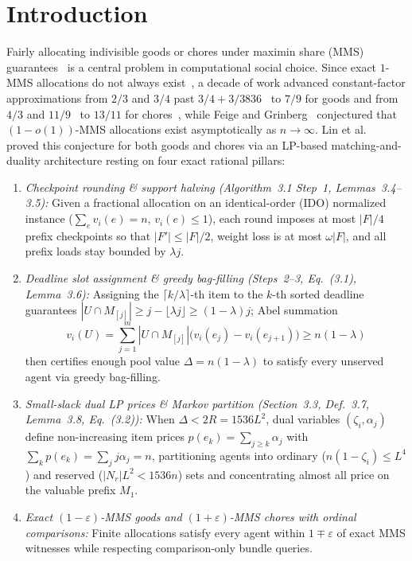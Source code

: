 \documentclass[11pt,twocolumn]{article}
\begin{document}
\section{Introduction}
Fairly allocating indivisible goods or chores under maximin share (MMS) guarantees~\cite{budish2011combinatorial} is a central problem in computational social choice. Since exact $1$-MMS allocations do not always exist~\cite{kurokawa2018fair}, a decade of work advanced constant-factor approximations from $2/3$ and $3/4$ past $3/4 + 3/3836$~\cite{akrami2024breaking} to $7/9$ for goods and from $4/3$ and $11/9$~\cite{huang2021algorithmic} to $13/11$ for chores~\cite{huang2023reduction}, while Feige and Grinberg~\cite{feige2025asymptotic} conjectured that $(1 - o(1))$-MMS allocations exist asymptotically as $n \to \infty$. Lin et al.~\cite{lin2026mms} proved this conjecture for both goods and chores via an LP-based matching-and-duality architecture resting on four exact rational pillars:
\begin{enumerate}[leftmargin=*,nosep]
  \item \emph{Checkpoint rounding \& support halving (Algorithm~3.1 Step~1, Lemmas~3.4--3.5):} Given a fractional allocation on an identical-order (IDO) normalized instance ($\sum_e v_i(e)=n$, $v_i(e)\le 1$), each round imposes at most $|F|/4$ prefix checkpoints so that $|F'| \le |F|/2$, weight loss is at most $\omega |F|$, and all prefix loads stay bounded by $\lambda j$.
  \item \emph{Deadline slot assignment \& greedy bag-filling (Steps~2--3, Eq.~(3.1), Lemma~3.6):} Assigning the $\lceil k/\lambda\rceil$-th item to the $k$-th sorted deadline guarantees $|U \cap M_{[j]}| \ge j - \lfloor \lambda j\rfloor \ge (1-\lambda)j$; Abel summation
  \begin{equation}
    v_i(U) = \sum_{j=1}^{m} |U \cap M_{[j]}| \bigl(v_i(e_j) - v_i(e_{j+1})\bigr) \ge n(1-\lambda)
    \label{eq:abel}
  \end{equation}
  then certifies enough pool value $\Delta = n(1-\lambda)$ to satisfy every unserved agent via greedy bag-filling.
  \item \emph{Small-slack dual LP prices \& Markov partition (Section~3.3, Def.~3.7, Lemma~3.8, Eq.~(3.2)):} When $\Delta < 2R = 1536 L^2$, dual variables $(\zeta_i, \alpha_j)$ define non-increasing item prices $p(e_k) = \sum_{j\ge k} \alpha_j$ with $\sum_k p(e_k) = \sum_j j\alpha_j = n$, partitioning agents into ordinary ($n(1-\zeta_i) \le L^4$) and reserved ($|N_r| L^2 < 1536 n$) sets and concentrating almost all price on the valuable prefix $M_1$.
  \item \emph{Exact $(1-\varepsilon)$-MMS goods and $(1+\varepsilon)$-MMS chores with ordinal comparisons:} Finite allocations satisfy every agent within $1\mp\varepsilon$ of exact MMS witnesses while respecting comparison-only bundle queries.
\end{enumerate}
\end{document}
